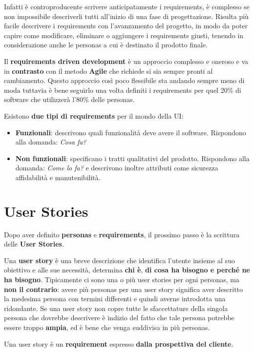 \documentclass[a4paper,11pt,oneside]{book}
\begin{document}
Infatti è controproducente scrivere anticipatamente i requirements,
è complesso se non impossibile descriverli tutti all'inizio di una fase di progettazione. Risulta più facile descrivere i requirements con l'avanzamento del progetto, in modo da poter capire come modificare, eliminare o aggiungere i requirements giusti, tenendo in considerazione anche le personas a cui è destinato il prodotto finale.

Il \textbf{requirements driven development} è un approccio complesso e oneroso e va in \textbf{contrasto} con il metodo \textbf{Agile} che richiede si sia sempre pronti al cambiamento. Questo approccio così poco flessibile sta andando sempre meno di moda tuttavia è bene seguirlo una volta definiti i requirements per quel 20\% di software che utilizzerà l'80\% delle personas.

Esistono \textbf{due tipi di requirements} per il mondo della UI:

\begin{itemize}
	\item \textbf{Funzionali}:
	      descrivono quali funzionalità deve avere il software. Rispondono alla domanda:
	      \textit{Cosa fa?}
	\item \textbf{Non funzionali}: specificano i tratti qualitativi del prodotto. Rispondono alla domanda: \textit{Come lo fa?} e descrivono inoltre
	      attributi come sicurezza affidabilità e manutenibilità.
\end{itemize}

\section{User Stories}
Dopo aver definito \textbf{personas} e \textbf{requirements}, il prossimo passo è la scrittura delle \textbf{User Stories}.

Una \textbf{user story} è una breve descrizione che identifica l'utente insieme al suo
obiettivo e alle sue necessità, determina \textbf{chi è}, \textbf{di cosa ha bisogno e perché ne ha bisogno}. Tipicamente ci sono una o più user stories per ogni personas, ma \textbf{non il contrario}: avere più personas per una user story significa aver descritto la medesima persona con termini differenti e quindi averne introdotta una ridondante.
Se una user story non copre tutte le sfaccettature della singola persona che dovrebbe descrivere è indizio del fatto che tale persona potrebbe essere troppo \textbf{ampia}, ed è bene che venga suddivisa in più personas.

Una user story è un \textbf{requirement} espresso \textbf{dalla prospettiva del cliente}.
\end{document}
